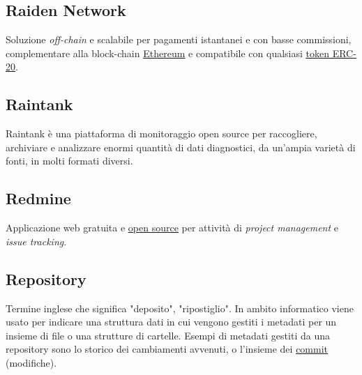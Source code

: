		\newpage


	\subsection{Raiden Network}
	\label{sec:raiden}
	Soluzione \emph{off-chain} e scalabile per pagamenti istantanei e con basse commissioni, complementare alla block-chain \underline{\hyperref[sec:ethereum]{Ethereum}} e compatibile con qualsiasi \underline{\hyperref[sec:erc20]{token ERC-20}}.


	\subsection{Raintank}
	\label{sec:raintank}
	Raintank è una piattaforma di monitoraggio open source per raccogliere, archiviare e analizzare enormi quantità di dati diagnostici, da un'ampia varietà di fonti, in molti formati diversi.


	\subsection{Redmine}
	\label{sec:redmine}
	Applicazione web gratuita e \underline{\hyperref[sec:opensource]{open source}} per attività di \emph{project management} e \emph{issue tracking}.

	\subsection{Repository}
	\label{sec:repo}
	Termine inglese che significa "deposito", "ripostiglio". In ambito informatico viene usato per indicare una struttura dati in cui vengono gestiti i metadati per un insieme di file o una strutture di cartelle. Esempi di metadati gestiti da una repository sono lo storico dei cambiamenti avvenuti, o l'insieme dei \underline{\hyperref[sec:commit]{commit}} (modifiche).


